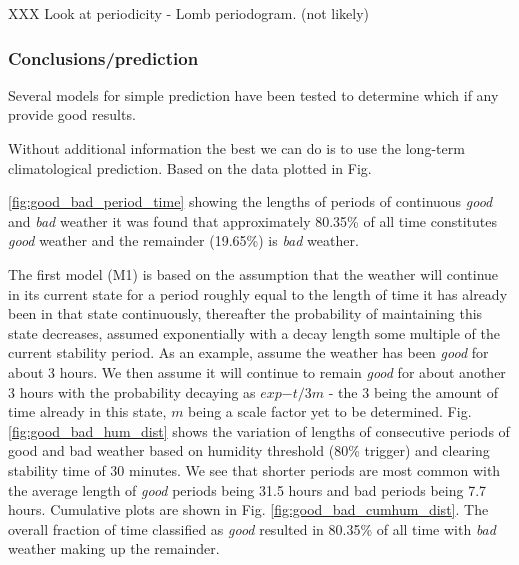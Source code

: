 XXX Look at periodicity - Lomb periodogram. (not likely)

\subsubsection{Conclusions/prediction}
Several models for simple prediction have been tested to determine which if any provide good results.

Without additional information the best we can do is to use the long-term climatological prediction. Based on the data plotted in Fig. {\ref{fig:good_bad_period_time} showing the lengths of periods of continuous \emph{good} and \emph{bad} weather it was found that approximately  80.35\% of all time constitutes \emph{good} weather and the remainder (19.65\%) is \emph{bad} weather.

The first model (M1) is based on the assumption that the weather will continue in its current state for a period roughly equal to the length of time it has already been in that state continuously, thereafter the probability of maintaining this state decreases, assumed exponentially with a decay length some multiple of the current stability period. As an example, assume the weather has been \emph{good} for about 3 hours. We then assume it will continue to remain \emph{good} for about another 3 hours with the probability decaying as $exp{-t/3m}$ - the 3 being the amount of time already in this state, $m$ being a scale factor yet to be determined. Fig. \ref{fig:good_bad_hum_dist} shows the variation of lengths of consecutive periods of good and bad weather based on humidity threshold (80\% trigger) and clearing stability time of 30 minutes. We see that shorter periods are most common with the average length of \emph{good} periods being 31.5 hours and bad periods being 7.7 hours. Cumulative plots are shown in Fig. \ref{fig:good_bad_cumhum_dist}. The overall fraction of time classified as \emph{good} resulted in 80.35\% of all time with \emph{bad} weather making up the remainder.

}
